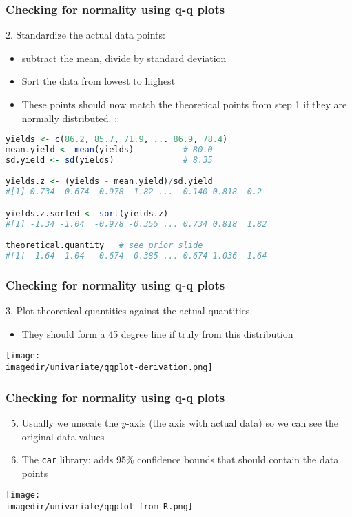 \begin{frame}[fragile]\frametitle{Checking for normality using q-q plots}
	2. Standardize the actual data points:
	\begin{itemize}
		\item	subtract the mean, divide by standard deviation
		\item	Sort the data from lowest to highest
		\item	These points should now match the theoretical points from step 1 if they are normally distributed. \emph{{\color{myGreen}{Example}}}:
	\end{itemize}

	\begin{lstlisting}[language=R]
yields <- c(86.2, 85.7, 71.9, ... 86.9, 78.4)
mean.yield <- mean(yields)          # 80.0
sd.yield <- sd(yields)              # 8.35

yields.z <- (yields - mean.yield)/sd.yield
#[1] 0.734  0.674 -0.978  1.82 ... -0.140 0.818 -0.2

yields.z.sorted <- sort(yields.z)
#[1] -1.34 -1.04  -0.978 -0.355 ... 0.734 0.818  1.82

theoretical.quantity   # see prior slide
#[1] -1.64 -1.04  -0.674 -0.385 ... 0.674 1.036  1.64
	\end{lstlisting}
\end{frame}

\begin{frame}\frametitle{Checking for normality using q-q plots}

	3. Plot theoretical quantities against the actual quantities.
	\begin{itemize}
		\item	\small They should form a 45 degree line if truly from this distribution
	\end{itemize}
	\begin{center}
		\texttt{[image: \\imagedir/univariate/qqplot-derivation.png]}
	\end{center}
\end{frame}

\begin{frame}\frametitle{Checking for normality using q-q plots}
	\begin{enumerate}
		\setcounter{enumii}{4}
		\item	Usually we unscale the $y$-axis (the axis with actual data) so we can see the original data values
		\item	The \texttt{car} library: adds 95\% confidence bounds that should contain the data points
	\end{enumerate}
	\vspace{-8pt}
	\begin{center}
		\texttt{[image: \\imagedir/univariate/qqplot-from-R.png]}

	\end{center}

\end{frame}

